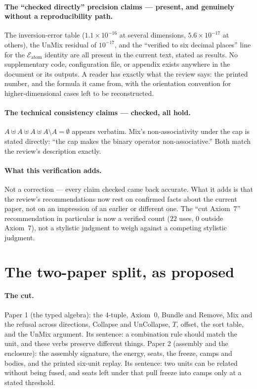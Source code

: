 \documentclass[11pt]{article}
\begin{document}
\paragraph{The ``checked directly'' precision claims --- present,
and genuinely without a reproducibility path.} The inversion-error
table ($1.1\times10^{-16}$ at several dimensions, $5.6\times10^{-17}$
at others), the UnMix residual of $10^{-17}$, and the
``verified to six decimal places'' line for the
$\mathcal{E}_{\text{atom}}$ identity are all present in the current
text, stated as results. No supplementary code, configuration file,
or appendix exists anywhere in the document or its outputs. A reader
has exactly what the review says: the printed number, and the
formula it came from, with the orientation convention for
higher-dimensional cases left to be reconstructed.

\paragraph{The technical consistency claims --- checked, all hold.}
$A\uplus A\uplus A\uplus A\setminus A=\emptyset$ appears verbatim.
Mix's non-associativity under the cap is stated directly: ``the cap
makes the binary operator non-associative.'' Both match the review's
description exactly.

\paragraph{What this verification adds.} Not a correction --- every
claim checked came back accurate. What it adds is that the review's
recommendations now rest on confirmed facts about the current paper,
not on an impression of an earlier or different one. The ``cut
Axiom~7'' recommendation in particular is now a verified count
($22$ uses, $0$ outside Axiom~7), not a stylistic judgment to weigh
against a competing stylistic judgment.

\section{The two-paper split, as proposed}

\paragraph{The cut.} Paper 1 (the typed algebra): the 4-tuple,
Axiom~0, Bundle and Remove, Mix and the refusal across directions,
Collapse and UnCollapse, $T$, offset, the sort table, and the UnMix
argument. Its sentence: a combination rule should match the unit, and
these verbs preserve different things. Paper 2 (assembly and the
enclosure): the assembly signature, the energy, seats, the freeze,
camps and bodies, and the printed six-unit replay. Its sentence: two
units can be related without being fused, and seats left under that
pull freeze into camps only at a stated threshold.
\end{document}
